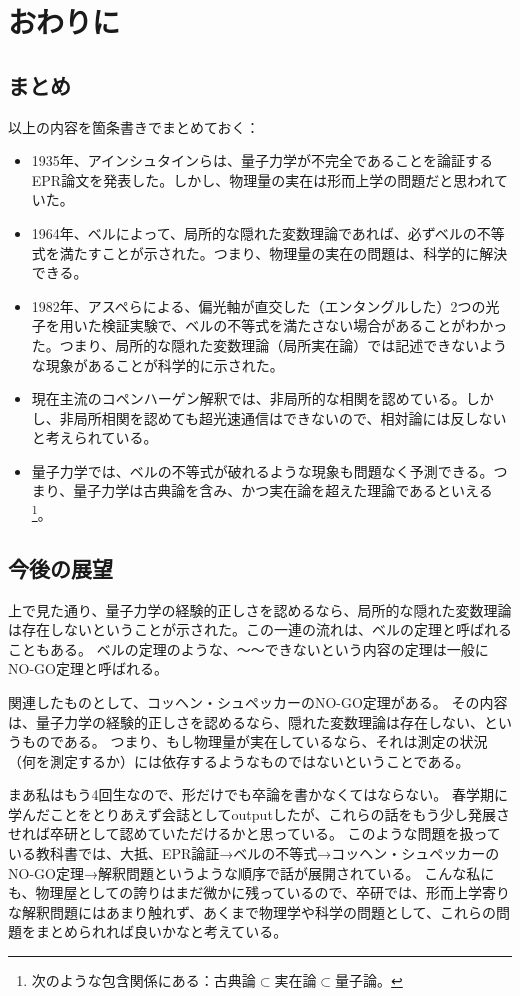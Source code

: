 \documentclass[10pt,b5paper,papersize,dvipdfmx]{jsbook}
\begin{document}
\fi
\section{おわりに}\label{sec:3}

\subsection{まとめ}
以上の内容を箇条書きでまとめておく：

\begin{itemize}
  \item 1935年、アインシュタインらは、量子力学が不完全であることを論証するEPR論文を発表した。しかし、物理量の実在は形而上学の問題だと思われていた。
  \item 1964年、ベルによって、局所的な隠れた変数理論であれば、必ずベルの不等式を満たすことが示された。つまり、物理量の実在の問題は、科学的に解決できる。
  \item 1982年、アスペらによる、偏光軸が直交した（エンタングルした）2つの光子を用いた検証実験で、ベルの不等式を満たさない場合があることがわかった。つまり、局所的な隠れた変数理論（局所実在論）では記述できないような現象があることが科学的に示された。
  \item 現在主流のコペンハーゲン解釈では、非局所的な相関を認めている。しかし、非局所相関を認めても超光速通信はできないので、相対論には反しないと考えられている。
  \item 量子力学では、ベルの不等式が破れるような現象も問題なく予測できる。つまり、量子力学は古典論を含み、かつ実在論を超えた理論であるといえる\footnote{
    次のような包含関係にある：$\text{古典論} \subset \text{実在論} \subset{量子論}。$
  }。
\end{itemize}

%
\subsection{今後の展望}
上で見た通り、量子力学の経験的正しさを認めるなら、局所的な隠れた変数理論は存在しないということが示された。この一連の流れは、ベルの定理と呼ばれることもある。
ベルの定理のような、〜〜できないという内容の定理は一般にNO-GO定理と呼ばれる。\par
関連したものとして、コッヘン・シュペッカーのNO-GO定理がある。
その内容は、量子力学の経験的正しさを認めるなら、隠れた変数理論は存在しない、というものである。
つまり、もし物理量が実在しているなら、それは測定の状況（何を測定するか）には依存するようなものではないということである。
\par
まあ私はもう4回生なので、形だけでも卒論を書かなくてはならない。
春学期に学んだことをとりあえず会誌としてoutputしたが、これらの話をもう少し発展させれば卒研として認めていただけるかと思っている。
このような問題を扱っている教科書では、大抵、EPR論証→ベルの不等式→コッヘン・シュペッカーのNO-GO定理→解釈問題というような順序で話が展開されている。
こんな私にも、物理屋としての誇りはまだ微かに残っているので、卒研では、形而上学寄りな解釈問題にはあまり触れず、あくまで物理学や科学の問題として、これらの問題をまとめられれば良いかなと考えている。\par
\end{document}
